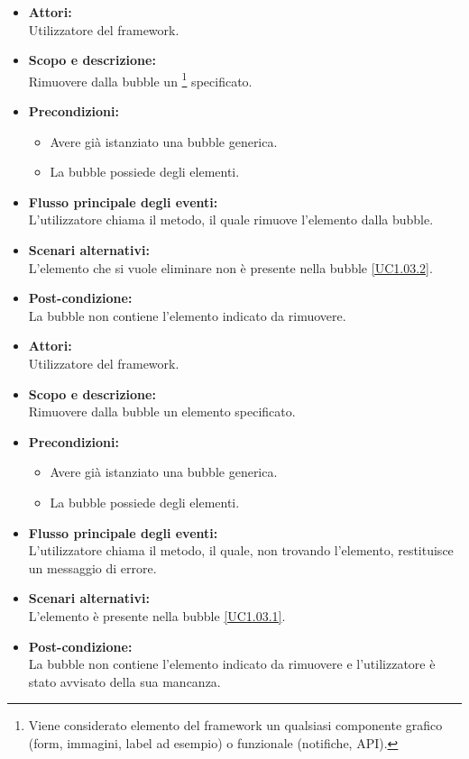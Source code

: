\begin{itemize}
	\item \textbf{Attori:}
	\\Utilizzatore del framework.
	\item \textbf{Scopo e descrizione:}
	\\Rimuovere dalla bubble un \footnote{Viene considerato elemento del framework un qualsiasi componente grafico (form, immagini, label ad esempio) o funzionale (notifiche, API).} specificato.
	\item \textbf{Precondizioni:}
	\begin{itemize}
		\item Avere già istanziato una bubble generica.
		\item La bubble possiede degli elementi.
	\end{itemize}
	\item \textbf{Flusso principale degli eventi:}
	\\L'utilizzatore chiama il metodo, il quale rimuove l'elemento dalla bubble.
	\item \textbf{Scenari alternativi:}
	\\L'elemento che si vuole eliminare non è presente nella bubble \ref{UC1.03.2}.
	\item \textbf{Post-condizione:}
	\\La bubble non contiene l'elemento indicato da rimuovere.
\end{itemize}


\begin{itemize}
	\item \textbf{Attori:}
	\\Utilizzatore del framework.
	\item \textbf{Scopo e descrizione:} 
	\\Rimuovere dalla bubble un elemento specificato.
	\item \textbf{Precondizioni:}
	\begin{itemize}
		\item Avere già istanziato una bubble generica.
		\item La bubble possiede degli elementi.
	\end{itemize}
	\item \textbf{Flusso principale degli eventi:}
	\\L'utilizzatore chiama il metodo, il quale, non trovando l'elemento, restituisce un messaggio di errore.
	\item \textbf{Scenari alternativi:}
	\\L'elemento è presente nella bubble \ref{UC1.03.1}.
	\item \textbf{Post-condizione:}
	\\La bubble non contiene l'elemento indicato da rimuovere e l'utilizzatore è stato avvisato della sua mancanza.
\end{itemize}

